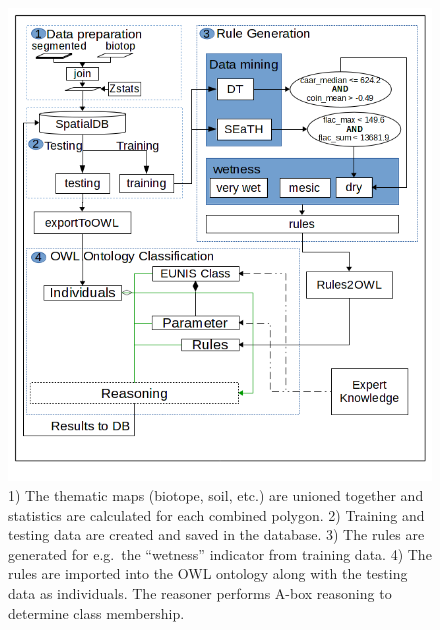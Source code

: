 \documentclass[authoryear, review,12pt,number]{elsarticle}
\begin{document}
\begin{figure}
\includegraphics[width=1\linewidth]{diagrams/final_workflow_diagram.png}
\caption
    {
        1) The thematic maps (biotope, soil, etc.) are unioned together and
        statistics are calculated for each combined polygon.
        2) Training and testing data are created and saved in the database.
        3) The rules are generated for e.g.\ the ``wetness'' indicator from
        training data.
        4) The rules are imported into the OWL ontology along with the testing
        data as individuals. The reasoner performs A-box reasoning to determine
        class membership.
    } 
\label{fig:full_workflow}
\end{figure}
\label{subsec:reference_data_and_semantic_characterisation} 
\end{document}
